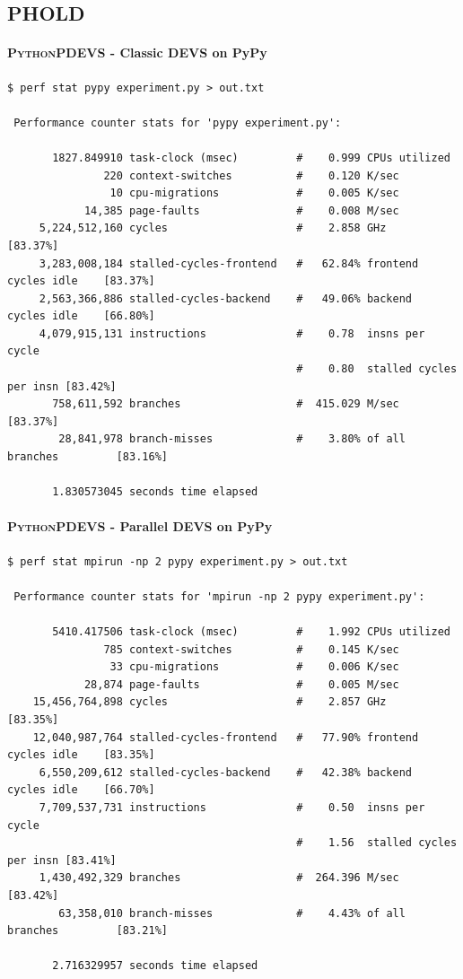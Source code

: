 \documentclass[8pt,a4paper]{report}
\begin{document}
\subsection{PHOLD}
\paragraph{\textsc{PythonPDEVS} - Classic DEVS on PyPy}
\begin{Verbatim}[fontsize=\small]
$ perf stat pypy experiment.py > out.txt

 Performance counter stats for 'pypy experiment.py':

       1827.849910 task-clock (msec)         #    0.999 CPUs utilized          
               220 context-switches          #    0.120 K/sec                  
                10 cpu-migrations            #    0.005 K/sec                  
            14,385 page-faults               #    0.008 M/sec                  
     5,224,512,160 cycles                    #    2.858 GHz                     [83.37%]
     3,283,008,184 stalled-cycles-frontend   #   62.84% frontend cycles idle    [83.37%]
     2,563,366,886 stalled-cycles-backend    #   49.06% backend  cycles idle    [66.80%]
     4,079,915,131 instructions              #    0.78  insns per cycle        
                                             #    0.80  stalled cycles per insn [83.42%]
       758,611,592 branches                  #  415.029 M/sec                   [83.37%]
        28,841,978 branch-misses             #    3.80% of all branches         [83.16%]

       1.830573045 seconds time elapsed
\end{Verbatim}
\paragraph{\textsc{PythonPDEVS} - Parallel DEVS on PyPy}
\begin{Verbatim}[fontsize=\small]
$ perf stat mpirun -np 2 pypy experiment.py > out.txt

 Performance counter stats for 'mpirun -np 2 pypy experiment.py':

       5410.417506 task-clock (msec)         #    1.992 CPUs utilized          
               785 context-switches          #    0.145 K/sec                  
                33 cpu-migrations            #    0.006 K/sec                  
            28,874 page-faults               #    0.005 M/sec                  
    15,456,764,898 cycles                    #    2.857 GHz                     [83.35%]
    12,040,987,764 stalled-cycles-frontend   #   77.90% frontend cycles idle    [83.35%]
     6,550,209,612 stalled-cycles-backend    #   42.38% backend  cycles idle    [66.70%]
     7,709,537,731 instructions              #    0.50  insns per cycle        
                                             #    1.56  stalled cycles per insn [83.41%]
     1,430,492,329 branches                  #  264.396 M/sec                   [83.42%]
        63,358,010 branch-misses             #    4.43% of all branches         [83.21%]

       2.716329957 seconds time elapsed
\end{Verbatim}
\end{document}

